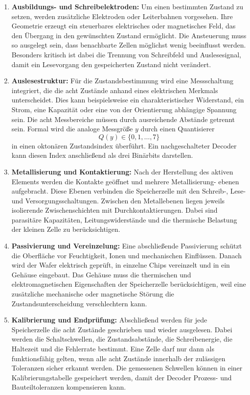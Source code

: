 \documentclass[12pt, a4paper]{article}
\theoremstyle{definition}
\theoremstyle{remark}
\begin{document}
\begin{enumerate}[label=\arabic*.]
  \item \textbf{Ausbildungs- und Schreibelektroden:} Um einen bestimmten
  Zustand zu setzen, werden zusätzliche Elektroden oder Leiterbahnen
  vorgesehen. Ihre Geometrie erzeugt ein steuerbares elektrisches oder
  magnetisches Feld, das den Übergang in den gewünschten Zustand ermöglicht.
  Die Ansteuerung muss so ausgelegt sein, dass benachbarte Zellen möglichst
  wenig beeinflusst werden. Besonders kritisch ist dabei die Trennung von
  Schreibfeld und Auslesesignal, damit ein Lesevorgang den gespeicherten
  Zustand nicht verändert.

  \item \textbf{Auslesestruktur:} Für die Zustandsbestimmung wird eine
  Messschaltung integriert, die die acht Zustände anhand eines elektrischen
  Merkmals unterscheidet. Dies kann beispielsweise ein charakteristischer
  Widerstand, ein Strom, eine Kapazität oder eine von der Orientierung
  abhängige Spannung sein. Die acht Messbereiche müssen durch ausreichende
  Abstände getrennt sein. Formal wird die analoge Messgröße \(y\) durch einen
  Quantisierer
  \[
    Q(y) \in \{0,1,\ldots,7\}
  \]
  in einen oktonären Zustandsindex überführt. Ein nachgeschalteter Decoder
  kann diesen Index anschließend als drei Binärbits darstellen.

  \item \textbf{Metallisierung und Kontaktierung:} Nach der Herstellung des
  aktiven Elements werden die Kontakte geöffnet und mehrere Metallisierung-
  ebenen aufgebracht. Diese Ebenen verbinden die Speicherzelle mit den
  Schreib-, Lese- und Versorgungsschaltungen. Zwischen den Metallebenen
  liegen jeweils isolierende Zwischenschichten mit Durchkontaktierungen.
  Dabei sind parasitäre Kapazitäten, Leitungswiderstände und die thermische
  Belastung der kleinen Zelle zu berücksichtigen.

  \item \textbf{Passivierung und Vereinzelung:} Eine abschließende
  Passivierung schützt die Oberfläche vor Feuchtigkeit, Ionen und mechanischen
  Einflüssen. Danach wird der Wafer elektrisch geprüft, in einzelne Chips
  vereinzelt und in ein Gehäuse eingebaut. Das Gehäuse muss die thermischen
  und elektromagnetischen Eigenschaften der Speicherzelle berücksichtigen,
  weil eine zusätzliche mechanische oder magnetische Störung die
  Zustandsunterscheidung verschlechtern kann.

  \item \textbf{Kalibrierung und Endprüfung:} Abschließend werden für jede
  Speicherzelle die acht Zustände geschrieben und wieder ausgelesen. Dabei
  werden die Schaltschwellen, die Zustandsabstände, die Schreibenergie, die
  Haltezeit und die Fehlerrate bestimmt. Eine Zelle darf nur dann als
  funktionsfähig gelten, wenn alle acht Zustände innerhalb der zulässigen
  Toleranzen sicher erkannt werden. Die gemessenen Schwellen können in einer
  Kalibrierungstabelle gespeichert werden, damit der Decoder Prozess- und
  Bauteiltoleranzen kompensieren kann.
\end{enumerate}
\end{document}
